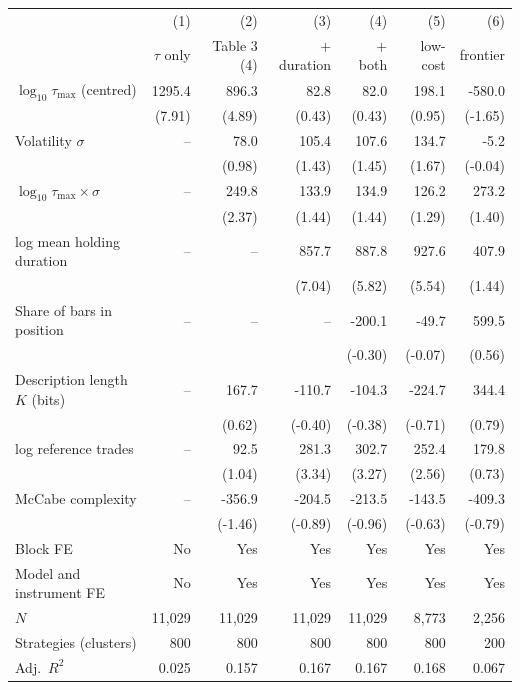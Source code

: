 \begin{tabular}{lrrrrrr}
\toprule
 & (1) & (2) & (3) & (4) & (5) & (6) \\
 & $\tau$ only & Table 3 (4) & $+$ duration & $+$ both & low-cost & frontier \\
\midrule
$\log_{10}\tau_{\max}$ (centred) & 1295.4 & 896.3 & 82.8 & 82.0 & 198.1 & -580.0 \\
 & (7.91) & (4.89) & (0.43) & (0.43) & (0.95) & (-1.65) \\
Volatility $\sigma$ & -- & 78.0 & 105.4 & 107.6 & 134.7 & -5.2 \\
 &  & (0.98) & (1.43) & (1.45) & (1.67) & (-0.04) \\
$\log_{10}\tau_{\max}\times\sigma$ & -- & 249.8 & 133.9 & 134.9 & 126.2 & 273.2 \\
 &  & (2.37) & (1.44) & (1.44) & (1.29) & (1.40) \\
log mean holding duration & -- & -- & 857.7 & 887.8 & 927.6 & 407.9 \\
 &  &  & (7.04) & (5.82) & (5.54) & (1.44) \\
Share of bars in position & -- & -- & -- & -200.1 & -49.7 & 599.5 \\
 &  &  &  & (-0.30) & (-0.07) & (0.56) \\
Description length $K$ (bits) & -- & 167.7 & -110.7 & -104.3 & -224.7 & 344.4 \\
 &  & (0.62) & (-0.40) & (-0.38) & (-0.71) & (0.79) \\
log reference trades & -- & 92.5 & 281.3 & 302.7 & 252.4 & 179.8 \\
 &  & (1.04) & (3.34) & (3.27) & (2.56) & (0.73) \\
McCabe complexity & -- & -356.9 & -204.5 & -213.5 & -143.5 & -409.3 \\
 &  & (-1.46) & (-0.89) & (-0.96) & (-0.63) & (-0.79) \\
\midrule
Block FE & No & Yes & Yes & Yes & Yes & Yes \\
Model and instrument FE & No & Yes & Yes & Yes & Yes & Yes \\
$N$ & 11{,}029 & 11{,}029 & 11{,}029 & 11{,}029 & 8{,}773 & 2{,}256 \\
Strategies (clusters) & 800 & 800 & 800 & 800 & 800 & 200 \\
Adj.\ $R^2$ & 0.025 & 0.157 & 0.167 & 0.167 & 0.168 & 0.067 \\
\bottomrule
\end{tabular}
